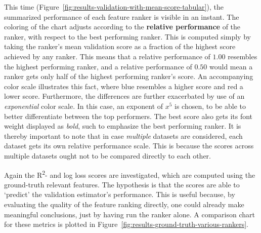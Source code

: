 \documentclass[../main.tex]{subfiles}
\begin{document}
This time (Figure~\ref{fig:results-validation-with-mean-score-tabular}), the summarized performance of each feature ranker is visible in an instant. The coloring of the chart adjusts according to the \textbf{relative performance} of the ranker, with respect to the best performing ranker. This is computed simply by taking the ranker's mean validation score as a fraction of the highest score achieved by any ranker. This means that a relative performance of $1.00$ resembles the highest performing ranker, and a relative performance of $0.50$ would mean a ranker gets only half of the highest performing ranker's score. An accompanying color scale illustrates this fact, where blue resembles a higher score and red a lower score. Furthermore, the differences are further exacerbated by use of an \textit{exponential} color scale. In this case, an exponent of $x^5$ is chosen, to be able to better differentiate between the top performers. The best score also gets its font weight displayed as \textit{bold}, such to emphasize the best performing ranker.
It is thereby important to note that in case \textit{multiple} datasets are considered, each dataset gets its own relative performance scale. This is because the scores across multiple datasets ought not to be compared directly to each other.



Again the R\textsuperscript{2}- and log loss scores are investigated, which are computed using the ground-truth relevant features. The hypothesis is that the scores are able to `predict' the validation estimator's performance. This is useful because, by evaluating the quality of the feature ranking directly, one could already make meaningful conclusions, just by having run the ranker alone. A comparison chart for these metrics is plotted in Figure~\ref{fig:results-ground-truth-various-rankers}.
\end{document}
